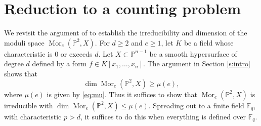 \documentclass[12pt, reqno]{amsart}
\numberwithin{equation}{section}
\newcommand{\0}{\mathbf{0}}
\newcommand{\PP}{\mathbb{P}}
\newcommand{\FF}{\mathbb{F}}
\renewcommand{\leq}{\leqslant}
\renewcommand{\geq}{\geqslant}
\def \Mor {\operatorname{Mor}}
\renewcommand{\=}{\equiv}
\newcommand{\1}{\mathbf{1}}
\theoremstyle{definition}
\begin{document}
\section{Reduction to a counting problem }\label{s:key}


We revisit the argument of \cite{BV'} to establish the irreducibility
 and dimension of the moduli space $\Mor_{e}(\PP^2,X)$.
For  $d\geq 2$ and $e\geq 1$, let
 $K$ be a field whose characteristic is $0$ or exceeds $d$.
Let
$X\subset \PP^{n-1}$ be a smooth hypersurface of degree $d$  defined
by a form
 $f \in K[x_1,\dots,x_n]$.
The argument  in Section \ref{s:intro} shows that
$$
\dim \Mor_e(\PP^2,X)\geq \mu(e),
$$ 
where $\mu(e)$ is given by
\eqref{eq:mu}.
Thus it suffices to show that
 $\Mor_e(\PP^2,X)$
 is irreducible with  $\dim \Mor_e(\PP^2,X)\leq \mu(e)$.
 Spreading out to a finite field $\FF_q$, with characteristic $p>d$, it suffices to do this
 when everything is defined over  $\FF_q$.
\end{document}
